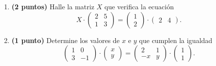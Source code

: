 
\begin{enumerate}[label=\alph*)]
\item \textbf{(2 puntos)} Halle la matriz $X$ que verifica la ecuación
\[
X\cdot\begin{pmatrix}2&5\\1&3\end{pmatrix}=\begin{pmatrix}1\\2\end{pmatrix}\cdot\begin{pmatrix}2&4\end{pmatrix}.
\]
\item \textbf{(1 punto)} Determine los valores de $x$ e $y$ que cumplen la igualdad
\[
\begin{pmatrix}1&0\\3&-1\end{pmatrix}\cdot\begin{pmatrix}x\\y\end{pmatrix}=\begin{pmatrix}2&1\\-x&y\end{pmatrix}\cdot\begin{pmatrix}1\\1\end{pmatrix}.
\]
\end{enumerate}
